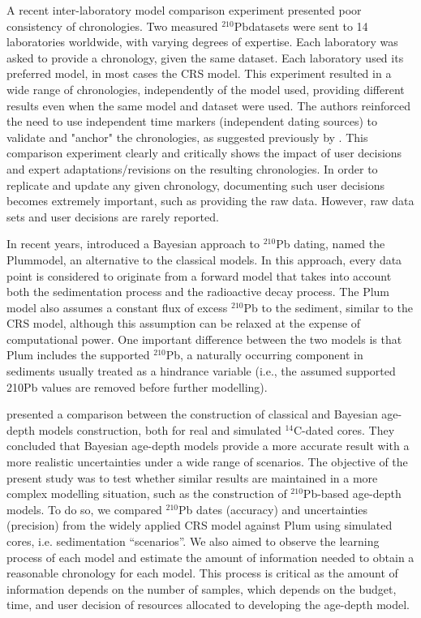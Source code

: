 \documentclass [10pt] {article}
\begin{document}
	A recent inter-laboratory model comparison experiment \citep{Barsanti2020}presented poor consistency of chronologies.
Two measured $^{210}$Pbdatasets were sent to 14 laboratories worldwide, with varying degrees of expertise. Each laboratory was asked to provide a chronology, given the same dataset. Each laboratory used its preferred model, in most cases the CRS model. This experiment resulted in a wide range of chronologies, independently of the model used, providing different results even when the same model and dataset were used. The authors reinforced the need to use independent time markers (independent dating sources) to validate and "anchor" the chronologies, as suggested previously by \citet{Smith2001}.  
This comparison experiment clearly and critically shows the impact of user decisions and expert adaptations/revisions on the resulting chronologies. In order to replicate and update any given chronology, documenting such user decisions becomes extremely important, such as providing the raw data. However, raw data sets and user decisions are rarely reported.

In recent years, \citet{Aquino2018} introduced a Bayesian approach to $^{210}$Pb dating, named the Plummodel, an alternative to the classical models. In this approach, every data point is considered to originate from a forward model that takes into account both the sedimentation process and the radioactive decay process. The Plum model also assumes a constant flux of excess $^{210}$Pb to the sediment, similar to the CRS model, although this assumption can be relaxed at the expense of computational power. One important difference between the two models is that Plum includes the supported $^{210}$Pb, a naturally occurring component in sediments usually treated as a hindrance variable (i.e., the assumed supported 210Pb values are removed before further modelling).

	\citet{Blaauw2018} presented a comparison between the construction of classical and Bayesian age-depth models construction, both for real and simulated $^{14}$C-dated cores.
They concluded that Bayesian age-depth models provide a more accurate result with a more realistic uncertainties under a wide range of scenarios.  
The objective of the present study was to test whether similar results are maintained in a more complex modelling situation, such as the construction of $^{210}$Pb-based age-depth models.
To do so, we compared $^{210}$Pb dates (accuracy) and uncertainties (precision) from the widely applied CRS model against Plum using simulated cores, i.e. sedimentation ``scenarios''.
We also aimed to observe the learning process of each model and estimate the amount of information needed to obtain a reasonable chronology for each model.
This process is critical as the amount of information depends on the number of samples, which depends on the budget, time, and user decision of resources allocated to developing the age-depth model.
\end{document}
